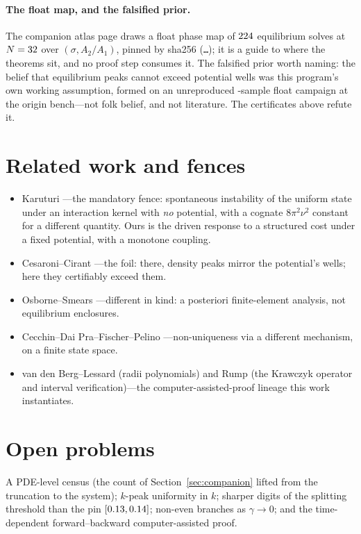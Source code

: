 \documentclass[11pt]{article}
\begin{document}
\paragraph{The float map, and the falsified prior.}
The companion atlas page draws a float phase map of $224$
equilibrium solves at $N=32$ over $(\sigma,A_2/A_1)$, pinned by
sha256 (\texttt{\PhaseMapSha\ldots}); it is a guide to where the theorems sit,
and no proof step consumes it. The falsified prior worth naming: the belief
that equilibrium peaks cannot exceed potential wells was this program's own
working assumption, formed on an unreproduced \PriorSamples-sample float
campaign at the origin bench---not folk belief, and not literature. The
certificates above refute it.

\section{Related work and fences}\label{sec:related}

\begin{itemize}
\item Karuturi \cite{Karuturi}---the mandatory fence: spontaneous instability
of the uniform state under an interaction kernel with \emph{no} potential,
with a cognate $8\pi^2\nu^2$ constant for a different quantity. Ours is the
driven response to a structured cost under a fixed potential, with a monotone
coupling.
\item Cesaroni--Cirant \cite{CesaroniCirant}---the foil: there, density peaks
mirror the potential's wells; here they certifiably exceed them.
\item Osborne--Smears \cite{OsborneSmears}---different in kind: a posteriori
finite-element analysis, not equilibrium enclosures.
\item Cecchin--Dai Pra--Fischer--Pelino \cite{CecchinEtAl}---non-uniqueness via
a different mechanism, on a finite state space.
\item van den Berg--Lessard \cite{vdBL} (radii polynomials) and Rump
\cite{Rump} (the Krawczyk operator and interval verification)---the
computer-assisted-proof lineage this work instantiates.
\end{itemize}

\section{Open problems}\label{sec:open}

A PDE-level census (the count of Section~\ref{sec:companion} lifted from the
truncation to the system); $k$-peak uniformity in $k$; sharper digits of the
splitting threshold than the pin $[0.13,0.14]$; non-even branches as
$\gamma\to0$; and the time-dependent forward--backward computer-assisted
proof.
\end{document}
